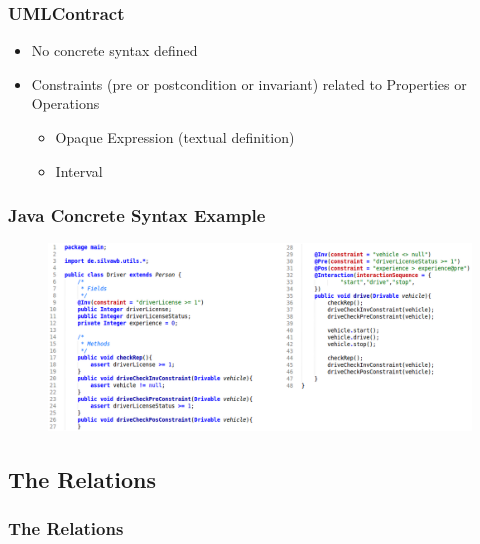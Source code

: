 \documentclass{beamer}
\begin{document}
\begin{frame}
	\frametitle{UMLContract}
	\begin{itemize}
		\item No concrete syntax defined
		\item Constraints (pre or postcondition or invariant) related to Properties or Operations
		\begin{itemize}
			\item Opaque Expression (textual definition)
			\item Interval
		\end{itemize}	
	\end{itemize}
\end{frame}

\begin{frame}
	\frametitle{Java Concrete Syntax Example}
	\nocite{heidenreich2009jamopp}
	\begin{figure}[H]
   		\includegraphics[width=\textwidth]{javaMetamodelExample01_Text}
	\end{figure}	
\end{frame}

\subsection{The Relations}
\begin{frame}
	\frametitle{The Relations}
\end{frame}
\end{document}
